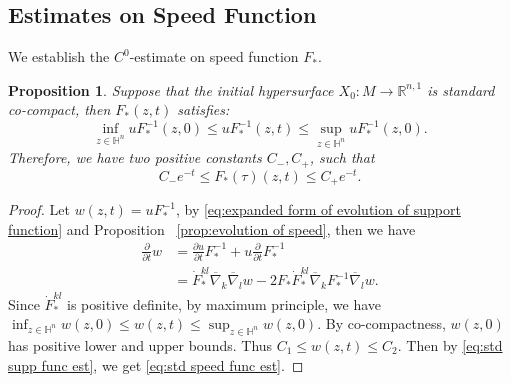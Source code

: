\documentclass[reqno]{amsart}
\newtheorem{proposition}[theorem]{Proposition}
\theoremstyle{remark}
\newcommand{\R}{\ensuremath{\mathbb{R}}}
\renewcommand{\H}{{\mathbb{H}}}
\newcommand{\pd}[2]{\frac{\partial {#1}}{\partial {#2}}}
\newcommand{\bnabla}{\overline{\nabla}}
\theoremstyle{definition}
\numberwithin{equation}{section}
\begin{document}
\subsection{Estimates on Speed Function}
We establish the \(C^0\)-estimate on speed function \(F_*\).
\begin{proposition}\label{prop:speed-estimate}
    Suppose that the initial hypersurface \(X_0:M\to \R^{n,1}\) is standard co-compact, then \(F_*(z,t)\) satisfies: 
    \begin{equation}
        \inf_{z\in \H^n}u F_*^{-1}(z,0) \leq u F_*^{-1}(z,t) \leq \sup_{z\in \H^n}u F_*^{-1}(z,0).
    \end{equation}
   Therefore, we have two positive constants \(C_-, C_+ \), such that  
    \begin{equation}\label{eq:std speed func est}
        C_- e^{-t} \leq F_*(\tau)(z,t) \leq C_+ e^{-t}.
    \end{equation}
\end{proposition}
\begin{proof}
    Let \(w(z,t) = uF_*^{-1}\), by \eqref{eq:expanded form of evolution of support function} and Proposition ~\ref{prop:evolution of speed}, then we have 
    \begin{equation*}
        \begin{aligned}
            \pd{}{t}w &= \pd{u}{t}F_*^{-1} + u\pd{}{t}F_*^{-1} \\
            &= \dot{F}_*^{kl}\bnabla_k \bnabla_l w - 2F_* \dot{F}_*^{kl}\bnabla_k F_*^{-1}\bnabla_l w.
        \end{aligned}
    \end{equation*}
    Since \(\dot{F}_*^{kl}\) is positive definite, by maximum principle, we have \(\inf_{z\in \H^n}w(z,0) \leq w(z,t)\leq \sup_{z\in \H^n}w(z,0)\). By co-compactness, \(w(z,0)\) has positive lower and upper bounds. Thus \(C_1\leq w(z,t) \leq C_2\). Then by \eqref{eq:std supp func est}, we get \eqref{eq:std speed func est}.
\end{proof}
\end{document}
